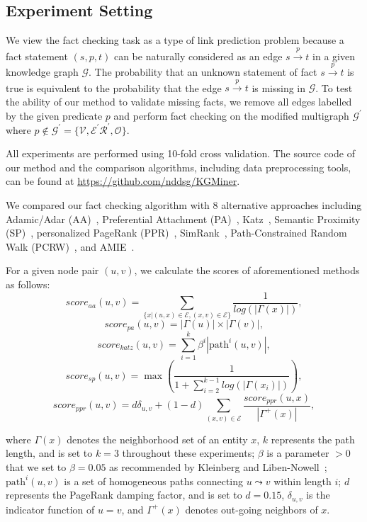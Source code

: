 \documentclass[reprint,twocolumn,showpacs,preprintnumbers,amsmath, aps,pre,amssymb]{revtex4-1}
\begin{document}
\subsection{Experiment Setting}

We view the fact checking task as a type of link prediction problem because a fact statement $(s,p,t)$ can be naturally considered as an edge $s\xrightarrow{p}t$ in a given knowledge graph $\mathcal{G}$. The probability that an unknown statement of fact $s\xrightarrow{p}t$ is true is equivalent to the probability that the edge $s\xrightarrow{p}t$ is missing in $\mathcal{G}$. To test the ability of our method to validate missing facts, we remove all edges labelled by the given predicate $p$ and perform fact checking on the modified multigraph $\mathcal{G}^\prime$ where $p\notin \mathcal{G}^\prime=\{ \mathcal{V}, \mathcal{E}^\prime \mathcal{R}^\prime, \mathcal{O}\}$. 

All experiments are performed using 10-fold cross validation. The source code of our method and the comparison algorithms, including data preprocessing tools, can be found at \url{https://github.com/nddsg/KGMiner}.


We compared our fact checking algorithm with 8 alternative approaches including Adamic/Adar (AA)~\cite{Adamic2003}, Preferential Attachment (PA)~\cite{Barabasi1999}, Katz~\cite{Katz1953}, Semantic Proximity (SP)~\cite{Ciampaglia2015}, personalized PageRank (PPR)~\cite{Haveliwala2002}, SimRank~\cite{Jeh2002}, Path-Constrained Random Walk (PCRW)~\cite{Lao2010}, and AMIE~\cite{Galarraga2013}.

For a given node pair $(u,v)$, we calculate the scores of aforementioned methods as follows:
$$score_{aa}(u,v) =\sum_{\{x | (u,x)\in \mathcal{E}, (x,v) \in \mathcal{E}\}}\frac{1}{log(|\Gamma(x)|)},$$
$$score_{pa}(u,v) =|\Gamma(u)| \times |\Gamma(v)|,$$
$$score_{katz}(u,v) =\sum_{i=1}^{k}\beta^i|\textrm{path}^i{(u,v)}|,$$
$$score_{sp}(u,v) = \max \left( \frac{1}{1 + \sum_{i=2}^{k-1}log(|\Gamma(x_i)|)} \right),$$
$$score_{ppr}(u,v) = d\delta_{u,v} + (1-d)\sum_{(x,v)\in\mathcal{E}}\frac{score_{ppr}(u,x)}{|\Gamma^+(x)|},$$

\noindent{}where $\Gamma(x)$ denotes the neighborhood set of an entity $x$, $k$ represents the path length, and is set to $k=3$ throughout these experiments; $\beta$ is a parameter $> 0$ that we set to $\beta=0.05$ as recommended by Kleinberg and Liben-Nowell~\cite{Kleinberg2007}; $\textrm{path}^i(u,v)$ is a set of homogeneous paths connecting $u\leadsto v$ within length $i$; $d$ represents the PageRank damping factor, and is set to $d=0.15$, $\delta_{u,v}$ is the indicator function of $u=v$, and $\Gamma^+(x)$ denotes out-going neighbors of $x$.
\end{document}

